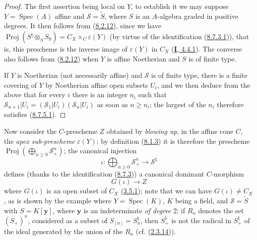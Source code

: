 \begin{proof}
The first assertion being local on $Y$, to establish it we may suppose
$Y=\operatorname{Spec}(A)$ affine and $\mathcal{S}=\widetilde{S}$, where $S$ is
an $A$-algebra graded in positive degrees. It then follows from
(\hyperref[II.8.2.12]{8.2.12}), since we have
$\operatorname{Proj}(S^{\natural}\otimes_S S_0)=
C_X\times_C\varepsilon(Y)$ (by virtue of the identification
(\hyperref[II.8.7.3.1]{8.7.3.1})), that is, this prescheme is the
inverse image of $\varepsilon(Y)$ in $C_X$
(\hyperref[I.4.4.1]{\textbf{I}, 4.4.1}). The converse also follows from
(\hyperref[II.8.2.12]{8.2.12}) when $Y$ is affine Noetherian and $S$ is of
finite type.

If $Y$ is Noetherian (not necessarily affine) and $\mathcal{S}$ is of finite
type, there is a finite covering of $Y$ by Noetherian affine open subsets
$U_i$, and we then deduce from the above that for every $i$ there is an
integer $n_i$ such that
$\mathcal{S}_{n+1}|U_i=(\mathcal{S}_1|U_i)(\mathcal{S}_n|U_i)$ as soon as
$n\geqslant n_i$; the largest of the $n_i$ therefore satisfies
(\hyperref[II.8.7.5.1]{8.7.5.1}).
\end{proof}

\begin{env}[8.7.6]
\label{II.8.7.6}
Now consider the $C$-prescheme $Z$ obtained by \emph{blowing up}, in the
affine cone $C$, the \emph{apex sub-prescheme} $\varepsilon(Y)$; by
definition (\hyperref[II.8.1.3]{8.1.3}) it is therefore the prescheme
$\operatorname{Proj}(\bigoplus_{n\geqslant 0}\mathcal{S}_+^n)$; the canonical
injection
\begin{equation}
\label{II.8.7.6.1}
  \iota:\bigoplus_{n\geqslant 0}\mathcal{S}_+^n
  \longrightarrow\mathcal{S}^{\natural}
\tag{8.7.6.1}
\end{equation}
defines (thanks to the identification (\hyperref[II.8.7.3]{8.7.3})) a
canonical dominant $C$-morphism
\begin{equation}
\label{II.8.7.6.2}
  G(\iota)\longrightarrow Z
\tag{8.7.6.2}
\end{equation}
where $G(\iota)$ is an open subset of $C_X$ (\hyperref[II.3.5.1]{3.5.1});
note that we can have $G(\iota)\ne C_X$, as is shown by the example where
$Y=\operatorname{Spec}(K)$, $K$ being a field, and $\mathcal{S}=\widetilde{S}$
with $S=K[\mathbf{y}]$, where $\mathbf{y}$ is an indeterminate \emph{of degree}
2; if $R_n$ denotes the set $(S_+)^n$, considered as a subset of
$S_{[n]}=S_n^{\natural}$, then $S_+^{\natural}$ is not the radical in
$S_+^{\natural}$ of the ideal generated by the union of the $R_n$ (cf.
(\hyperref[II.2.3.14]{2.3.14})).
\end{env}

